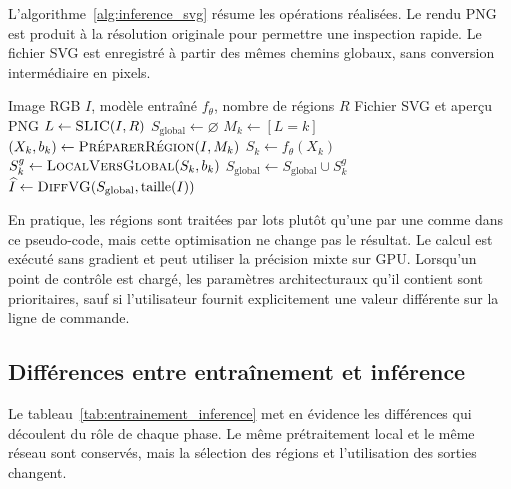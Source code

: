 \documentclass[12pt, a4paper, oneside]{report}
\begin{document}
L'algorithme~\ref{alg:inference_svg} résume les opérations réalisées. Le rendu PNG est produit à la résolution originale pour permettre une inspection rapide. Le fichier SVG est enregistré à partir des mêmes chemins globaux, sans conversion intermédiaire en pixels.

\begin{algorithm}[H]
    \caption{Vectorisation d'une image complète et génération du SVG.}
    \label{alg:inference_svg}
    \begin{algorithmic}[1]
        \Require Image RGB $I$, modèle entraîné $f_{\theta}$, nombre de régions $R$
        \Ensure Fichier SVG et aperçu PNG
        \State $L \gets \Call{SLIC}{I,R}$
        \State $S_{\mathrm{global}} \gets \varnothing$
            \State $M_k \gets [L=k]$
            \State $(X_k,b_k) \gets \Call{PréparerRégion}{I,M_k}$
            \State $S_k \gets f_{\theta}(X_k)$
            \State $S_k^{g} \gets \Call{LocalVersGlobal}{S_k,b_k}$
            \State $S_{\mathrm{global}} \gets S_{\mathrm{global}} \cup S_k^{g}$
        \EndFor
        \State $\widehat{I} \gets \Call{DiffVG}{S_{\mathrm{global}},\operatorname{taille}(I)}$
        \State {}
        \State {}
    \end{algorithmic}
\end{algorithm}

En pratique, les régions sont traitées par lots plutôt qu'une par une comme dans ce pseudo-code, mais cette optimisation ne change pas le résultat. Le calcul est exécuté sans gradient et peut utiliser la précision mixte sur GPU. Lorsqu'un point de contrôle est chargé, les paramètres architecturaux qu'il contient sont prioritaires, sauf si l'utilisateur fournit explicitement une valeur différente sur la ligne de commande.

\subsection{Différences entre entraînement et inférence}

Le tableau~\ref{tab:entrainement_inference} met en évidence les différences qui découlent du rôle de chaque phase. Le même prétraitement local et le même réseau sont conservés, mais la sélection des régions et l'utilisation des sorties changent.
\end{document}
